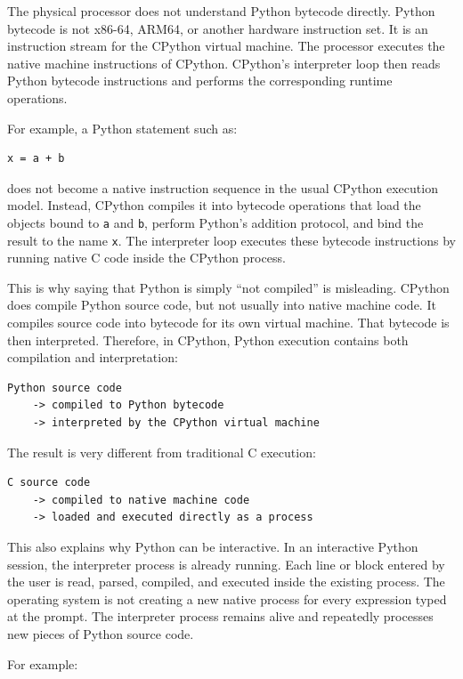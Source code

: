 \documentclass[a4paper,twoside]{report}
\begin{document}
The physical processor does not understand Python bytecode directly. Python bytecode is not x86-64, ARM64, or another hardware instruction set. It is an instruction stream for the CPython virtual machine. The processor executes the native machine instructions of CPython. CPython's interpreter loop then reads Python bytecode instructions and performs the corresponding runtime operations.

For example, a Python statement such as:

\begin{verbatim}
x = a + b
\end{verbatim}

does not become a native instruction sequence in the usual CPython execution model. Instead, CPython compiles it into bytecode operations that load the objects bound to \texttt{a} and \texttt{b}, perform Python's addition protocol, and bind the result to the name \texttt{x}. The interpreter loop executes these bytecode instructions by running native C code inside the CPython process.

This is why saying that Python is simply ``not compiled'' is misleading. CPython does compile Python source code, but not usually into native machine code. It compiles source code into bytecode for its own virtual machine. That bytecode is then interpreted. Therefore, in CPython, Python execution contains both compilation and interpretation:

\begin{verbatim}
Python source code
    -> compiled to Python bytecode
    -> interpreted by the CPython virtual machine
\end{verbatim}

The result is very different from traditional C execution:

\begin{verbatim}
C source code
    -> compiled to native machine code
    -> loaded and executed directly as a process
\end{verbatim}

This also explains why Python can be interactive. In an interactive Python session, the interpreter process is already running. Each line or block entered by the user is read, parsed, compiled, and executed inside the existing process. The operating system is not creating a new native process for every expression typed at the prompt. The interpreter process remains alive and repeatedly processes new pieces of Python source code.

For example:
\end{document}

